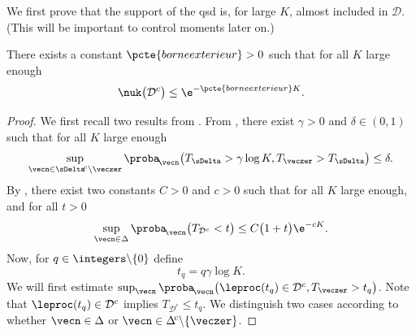 We first prove that the support of the qsd is, for large $K$, almost included in $ \mathcal{D}$. (This will be important to control moments later on.)
\begin{proposition}\label{borneexterieur}
There exists a constant $\pcte{borneexterieur}>0$ such that for all $K$ large enough
\[
\nuk\bigl(\mathcal{D}^{c}\bigr)\le \e^{-\pcte{borneexterieur}K}.
\]
\end{proposition}
\begin{proof}
We first recall two results from \cite{ccm2}.
From \cite[Lem.\,1.5]{ccm2}, there exist $\gamma>0$ and $\delta\in(0,1)$ such that for all $K$ large enough
\begin{equation}\label{res1}
\sup_{\vecn\in\sDelta^{\!c}\backslash\veczer}\proba_{\!\vecn}\bigl(T_{\sDelta}>\gamma\log K,T_{\veczer}>T_{\sDelta}\bigr)\leq \delta.
\end{equation}
By \cite[Sublem.\,5.8]{ccm2}, there exist two constants $C>0$ and $c>0$ such that for all $K$ large enough, and for all $t>0$
\begin{equation}\label{res2}
\sup_{\vecn\in\Delta}\proba_{\!\vecn}\bigl(T_{ \mathcal{D}^{c}}<t\bigr)\leq C\bigl(1+t\bigr) \e^{-c K}.
\end{equation}
Now, for $q\in\integers\backslash \{0\}$ define
\[
t_{q}=q\gamma\log K.
\]
We will first estimate
$\sup_{\vecn}\proba_{\!\vecn}\bigl(\leproc(t_{q})\in \mathcal{D}^{c}, T_{\veczer}>t_q\bigr)$.
Note that $\leproc(t_{q})\in \mathcal{D}^{c}$ implies $T_{ \mathcal{D}^{c}}\leq t_{q}$.
We distinguish two cases according to whether $\vecn\in \Delta$ or $\vecn\in \Delta^{\!c}\backslash\{\veczer\}$.


\end{proof}
